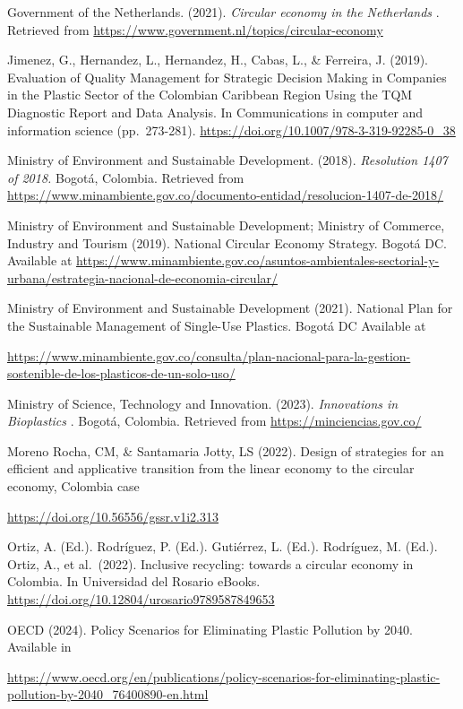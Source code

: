 \documentclass[
  12pt,
  oneside]{book}
\begin{document}
Government of the Netherlands. (2021). \emph{Circular economy in the
Netherlands }. Retrieved from
\url{https://www.government.nl/topics/circular-economy}

Jimenez, G., Hernandez, L., Hernandez, H., Cabas, L., \& Ferreira, J.
(2019). Evaluation of Quality Management for Strategic Decision Making
in Companies in the Plastic Sector of the Colombian Caribbean Region
Using the TQM Diagnostic Report and Data Analysis. In Communications in
computer and information science (pp.~273-281).
\url{https://doi.org/10.1007/978-3-319-92285-0_38}

Ministry of Environment and Sustainable Development. (2018).
\emph{Resolution 1407 of 2018. }Bogotá, Colombia. Retrieved from
\url{https://www.minambiente.gov.co/documento-entidad/resolucion-1407-de-2018/}

Ministry of Environment and Sustainable Development; Ministry of
Commerce, Industry and Tourism (2019). National Circular Economy
Strategy. Bogotá DC. Available at
\url{https://www.minambiente.gov.co/asuntos-ambientales-sectorial-y-urbana/estrategia-nacional-de-economia-circular/}

Ministry of Environment and Sustainable Development (2021). National
Plan for the Sustainable Management of Single-Use Plastics. Bogotá DC
Available at

\url{https://www.minambiente.gov.co/consulta/plan-nacional-para-la-gestion-sostenible-de-los-plasticos-de-un-solo-uso/}

Ministry of Science, Technology and Innovation. (2023).
\emph{Innovations in Bioplastics }. Bogotá, Colombia. Retrieved from
\url{https://minciencias.gov.co/}

Moreno Rocha, CM, \& Santamaria Jotty, LS (2022). Design of strategies
for an efficient and applicative transition from the linear economy to
the circular economy, Colombia case

\url{https://doi.org/10.56556/gssr.v1i2.313}

Ortiz, A. (Ed.). Rodríguez, P. (Ed.). Gutiérrez, L. (Ed.). Rodríguez, M.
(Ed.). Ortiz, A., et al.~(2022). Inclusive recycling: towards a circular
economy in Colombia. In Universidad del Rosario eBooks.
\url{https://doi.org/10.12804/urosario9789587849653}

OECD (2024). Policy Scenarios for Eliminating Plastic Pollution by 2040.
Available in

\url{https://www.oecd.org/en/publications/policy-scenarios-for-eliminating-plastic-pollution-by-2040_76400890-en.html}
\end{document}
